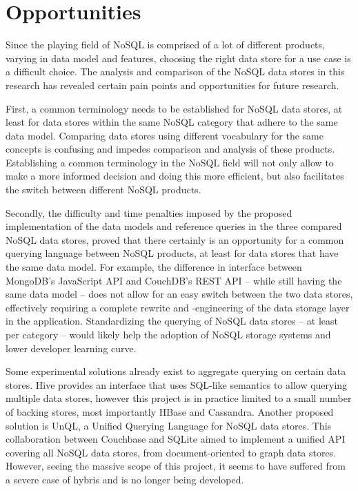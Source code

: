 \chapter{Opportunities}
\label{ch:opportunities}

Since the playing field of NoSQL is comprised of a lot of different products, varying in data model and features, choosing the right data store for a use case is a difficult choice.
The analysis and comparison of the NoSQL data stores in this research has revealed certain pain points and opportunities for future research.

First, a common terminology needs to be established for NoSQL data stores, at least for data stores within the same NoSQL category that adhere to the same data model.
Comparing data stores using different vocabulary for the same concepts is confusing and impedes comparison and analysis of these products.
Establishing a common terminology in the NoSQL field will not only allow to make a more informed decision and doing this more efficient, but also facilitates the switch between different NoSQL products.

Secondly, the difficulty and time penalties imposed by the proposed implementation of the data models and reference queries in the three compared NoSQL data stores, proved that there certainly is an opportunity for a common querying language between NoSQL products, at least for data stores that have the same data model.
For example, the difference in interface between MongoDB's JavaScript API and CouchDB's REST API -- while still having the same data model -- does not allow for an easy switch between the two data stores, effectively requiring a complete rewrite and -engineering of the data storage layer in the application.
Standardizing the querying of NoSQL data stores -- at least per category -- would likely help the adoption of NoSQL storage systems and lower developer learning curve.

Some experimental solutions already exist to aggregate querying on certain data stores.
Hive provides an interface that uses SQL-like semantics to allow querying multiple data stores, however this project is in practice limited to a small number of backing stores, most importantly HBase and Cassandra.
Another proposed solution is UnQL, a Unified Querying Language for NoSQL data stores.
This collaboration between Couchbase and SQLite aimed to implement a unified API covering all NoSQL data stores, from document-oriented to graph data stores.
However, seeing the massive scope of this project, it seems to have suffered from a severe case of hybris and is no longer being developed.

